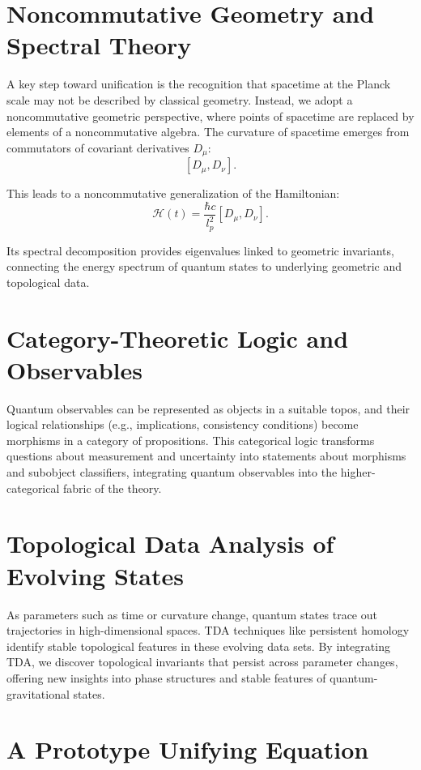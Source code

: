 \documentclass[12pt]{article}
\begin{document}
\section{Noncommutative Geometry and Spectral Theory}

A key step toward unification is the recognition that spacetime at the Planck scale may not be described by classical geometry. Instead, we adopt a noncommutative geometric perspective, where points of spacetime are replaced by elements of a noncommutative algebra. The curvature of spacetime emerges from commutators of covariant derivatives $D_\mu$:
\[
[D_\mu, D_\nu].
\]

This leads to a noncommutative generalization of the Hamiltonian:
\[
\mathcal{H}(t) = \frac{\hbar c}{l_p^2}[D_\mu, D_\nu].
\]

Its spectral decomposition provides eigenvalues linked to geometric invariants, connecting the energy spectrum of quantum states to underlying geometric and topological data.

\section{Category-Theoretic Logic and Observables}

Quantum observables can be represented as objects in a suitable topos, and their logical relationships (e.g., implications, consistency conditions) become morphisms in a category of propositions. This categorical logic transforms questions about measurement and uncertainty into statements about morphisms and subobject classifiers, integrating quantum observables into the higher-categorical fabric of the theory.

\section{Topological Data Analysis of Evolving States}

As parameters such as time or curvature change, quantum states trace out trajectories in high-dimensional spaces. TDA techniques like persistent homology identify stable topological features in these evolving data sets. By integrating TDA, we discover topological invariants that persist across parameter changes, offering new insights into phase structures and stable features of quantum-gravitational states.

\section{A Prototype Unifying Equation}
\end{document}
